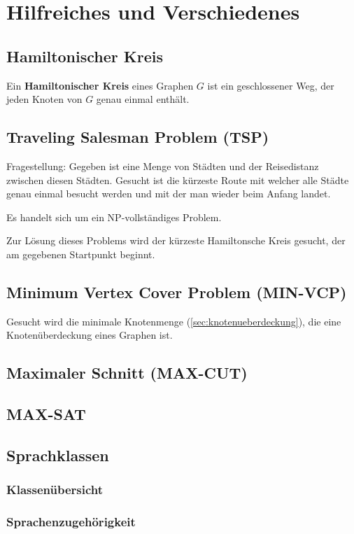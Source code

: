 \chapter{Hilfreiches und Verschiedenes}
\section{Hamiltonischer Kreis}
Ein \textbf{Hamiltonischer Kreis} eines Graphen $G$ ist ein geschlossener Weg, der jeden Knoten von $G$ genau einmal enthält.

\section{Traveling Salesman Problem (TSP)}
Fragestellung: Gegeben ist eine Menge von Städten und der Reisedistanz zwischen diesen Städten. Gesucht ist die kürzeste Route mit welcher alle Städte genau einmal besucht werden und mit der man wieder beim Anfang landet.

Es handelt sich um ein NP-vollständiges Problem.

Zur Lösung dieses Problems wird der kürzeste Hamiltonsche Kreis gesucht, der am gegebenen Startpunkt beginnt.

\section{Minimum Vertex Cover Problem (MIN-VCP)}
Gesucht wird die minimale Knotenmenge (\ref{sec:knotenueberdeckung}), die eine Knotenüberdeckung eines Graphen ist.

\section{Maximaler Schnitt (MAX-CUT)}

\section{MAX-SAT}

\section{Sprachklassen}
\subsection{Klassenübersicht}

\subsection{Sprachenzugehörigkeit}


